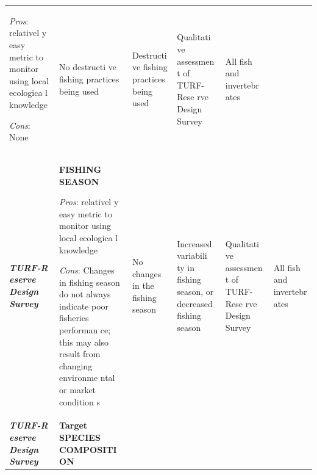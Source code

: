 \documentclass[]{book}
\begin{document}
\begin{longtable}[]{@{}llllll@{}}
\begin{minipage}[t]{0.16\columnwidth}
\emph{Pros}: relativel y easy metric to monitor using local ecologica l
knowledge

\emph{Cons}: None\strut
\end{minipage} & \begin{minipage}[t]{0.16\columnwidth}\raggedright\strut
No destructi ve fishing practices being used\strut
\end{minipage} & \begin{minipage}[t]{0.16\columnwidth}\raggedright\strut
Destructi ve fishing practices being used\strut
\end{minipage} & \begin{minipage}[t]{0.16\columnwidth}\raggedright\strut
Qualitati ve assessmen t of TURF-Rese rve Design Survey\strut
\end{minipage} & \begin{minipage}[t]{0.16\columnwidth}\raggedright\strut
All fish and invertebr ates\strut
\end{minipage}\tabularnewline
\begin{minipage}[t]{0.16\columnwidth}\raggedright\strut
\textbf{\emph{TURF-R eserve Design Survey}}\strut
\end{minipage} & \begin{minipage}[t]{0.16\columnwidth}\raggedright\strut
\textbf{FISHING SEASON}

\emph{Pros}: relativel y easy metric to monitor using local ecologica l
knowledge

\emph{Cons}: Changes in fishing season do not always indicate poor
fisheries performan ce; this may also result from changing environme
ntal or market condition s\strut
\end{minipage} & \begin{minipage}[t]{0.16\columnwidth}\raggedright\strut
No changes in the fishing season\strut
\end{minipage} & \begin{minipage}[t]{0.16\columnwidth}\raggedright\strut
Increased variabili ty in fishing season, or decreased fishing
season\strut
\end{minipage} & \begin{minipage}[t]{0.16\columnwidth}\raggedright\strut
Qualitati ve assessmen t of TURF-Rese rve Design Survey\strut
\end{minipage} & \begin{minipage}[t]{0.16\columnwidth}\raggedright\strut
All fish and invertebr ates\strut
\end{minipage}\tabularnewline
\begin{minipage}[t]{0.16\columnwidth}\raggedright\strut
\textbf{\emph{TURF-R eserve Design Survey}}\strut
\end{minipage} & \begin{minipage}[t]{0.16\columnwidth}\raggedright\strut
\textbf{Target SPECIES COMPOSITI ON}


\end{minipage}
\end{longtable}
\end{document}
